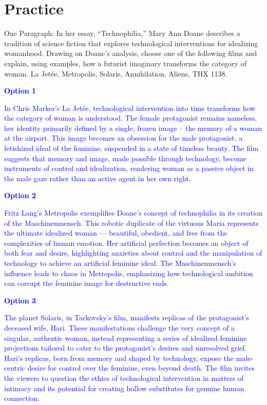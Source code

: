 \documentclass[11pt,fleqn]{book} %
\begin{document}
\section{Practice}
\begin{exercise}
    One Paragraph: In her essay, “Technophilia,” Mary Ann Doane describes a tradition of science fiction that explores technological interventions for idealizing womanhood. Drawing on Doane’s analysis, choose one of the following films and explain, using examples, how a futurist imaginary transforms the category of woman. La Jetée, Metropolis, Solaris, Annihilation, Aliens, THX 1138.

    \textcolor{blue}{
\textbf{Option 1}
}

    \textcolor{blue}{
    In Chris Marker's La Jetée, technological intervention into time transforms how the category of woman is understood. The female protagonist remains nameless, her identity primarily defined by a single, frozen image – the memory of a woman at the airport. This image becomes an obsession for the male protagonist, a fetishized ideal of the feminine, suspended in a state of timeless beauty. The film suggests that memory and image, made possible through technology, become instruments of control and idealization, rendering woman as a passive object in the male gaze rather than an active agent in her own right.}

    \textcolor{blue}{
\textbf{Option 2}
}
    
    \textcolor{blue}{
    Fritz Lang's Metropolis exemplifies Doane's concept of technophilia in its creation of the Maschinenmensch. This robotic duplicate of the virtuous Maria represents the ultimate idealized woman — beautiful, obedient, and free from the complexities of human emotion. Her artificial perfection becomes an object of both fear and desire, highlighting anxieties about control and the manipulation of technology to achieve an artificial feminine ideal. The Maschinenmensch's influence leads  to chaos in Metropolis, emphasizing how technological ambition can corrupt the feminine image for destructive ends.}

    \textcolor{blue}{
\textbf{Option 3}
}
    
    \textcolor{blue}{
    The planet Solaris, in Tarkovsky's film, manifests replicas of the protagonist's deceased wife, Hari. These manifestations challenge the very concept of a  singular, authentic woman, instead representing a series of idealized feminine projections tailored to cater to the protagonist's desires and unresolved grief. Hari's replicas, born from memory and shaped by technology, expose the male-centric desire for control over the feminine, even beyond death. The film invites the viewers to question the ethics of  technological intervention in matters of intimacy and its potential for creating hollow substitutes for genuine human connection.}


\end{exercise}
\end{document}
